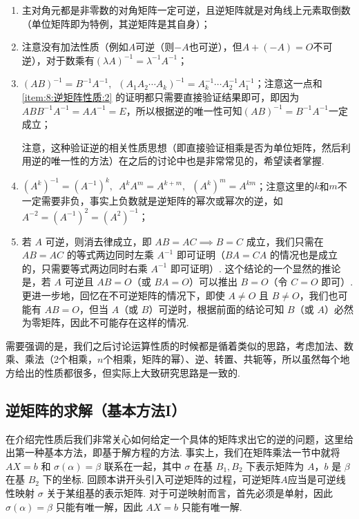 \begin{enumerate}[label=(\arabic*)]
    \item 主对角元都是非零数的对角矩阵一定可逆，且逆矩阵就是对角线上元素取倒数（单位矩阵即为特例，其逆矩阵是其自身）；

    \item \label{item:8:逆矩阵性质:2}
          注意没有加法性质（例如$A$可逆（则$-A$也可逆），但$A+(-A)=O$不可逆），对于数乘有$(\lambda A)^{-1}=\lambda^{-1}A^{-1}$；

    \item \label{item:8:逆矩阵性质:3}
          $(AB)^{-1}=B^{-1}A^{-1},\enspace (A_1A_2\cdots A_k)^{-1}=A_k^{-1}\cdots A_2^{-1}A_1^{-1}$；注意这一点和 \ref*{item:8:逆矩阵性质:2} 的证明都只需要直接验证结果即可，即因为$ABB^{-1}A^{-1}=AA^{-1}=E$，所以根据逆的唯一性可知$(AB)^{-1}=B^{-1}A^{-1}$一定成立；

          注意，这种验证逆的相关性质思想（即直接验证相乘是否为单位矩阵，然后利用逆的唯一性的方法）在之后的讨论中也是非常常见的，希望读者掌握.

    \item $(A^k)^{-1}=(A^{-1})^k,\enspace A^kA^m=A^{k+m},\enspace (A^k)^m=A^{km}$；注意这里的$k$和$m$不一定需要非负，事实上负数就是逆矩阵的幂次或幂次的逆，如$A^{-2}=(A^{-1})^2=(A^2)^{-1}$；

    \item 若 $A$ 可逆，则消去律成立，即 $AB=AC \implies B=C$ 成立，我们只需在 $AB=AC$ 的等式两边同时左乘 $A^{-1}$ 即可证明（$BA = CA$ 的情况也是成立的，只需要等式两边同时右乘 $A^{-1}$ 即可证明）. 这个结论的一个显然的推论是，若 $A$ 可逆且 $AB=O$（或 $BA = O$）可以推出 $B=O$（令 $C = O$ 即可）. 更进一步地，回忆在不可逆矩阵的情况下，即使 $A\neq O$ 且 $B\neq O$，我们也可能有 $AB = O$，但当 $A$（或 $B$）可逆时，根据前面的结论可知 $B$（或 $A$）必然为零矩阵，因此不可能存在这样的情况.
\end{enumerate}

需要强调的是，我们之后讨论运算性质的时候都是循着类似的思路，考虑加法、数乘、乘法（2个相乘，$n$个相乘，矩阵的幂）、逆、转置、共轭等，所以虽然每个地方给出的性质都很多，但实际上大致研究思路是一致的.

\subsection{逆矩阵的求解（基本方法I）}

在介绍完性质后我们非常关心如何给定一个具体的矩阵求出它的逆的问题，这里给出第一种基本方法，即基于解方程的方法. 事实上，我们在矩阵乘法一节中就将 $AX = b$ 和 $\sigma(\alpha) = \beta$ 联系在一起，其中 $\sigma$ 在基 $B_1, B_2$ 下表示矩阵为 $A$，$b$ 是 $\beta$ 在基 $B_2$ 下的坐标. 回顾本讲开头引入可逆矩阵的过程，可逆矩阵$A$应当是可逆线性映射 $\sigma$ 关于某组基的表示矩阵. 对于可逆映射而言，首先必须是单射，因此 $\sigma(\alpha) = \beta$ 只能有唯一解，因此 $AX = b$ 只能有唯一解.

